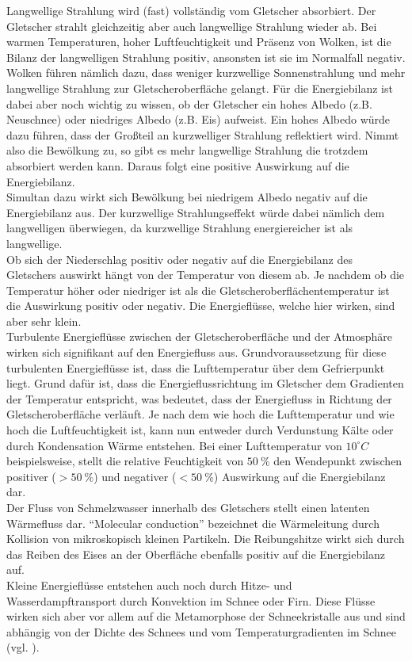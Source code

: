 \documentclass[12pt,a4paper]{article}
\begin{document}
Langwellige Strahlung wird (fast) vollständig vom Gletscher absorbiert. Der Gletscher strahlt gleichzeitig aber auch langwellige Strahlung wieder ab. Bei warmen Temperaturen, hoher Luftfeuchtigkeit und Präsenz von Wolken, ist die Bilanz der langwelligen Strahlung positiv, ansonsten ist sie im Normalfall negativ.\\
Wolken führen nämlich dazu, dass weniger kurzwellige Sonnenstrahlung und mehr langwellige Strahlung zur Gletscheroberfläche gelangt. Für die Energiebilanz ist dabei aber noch wichtig zu wissen, ob der Gletscher ein hohes Albedo (z.B. Neuschnee) oder niedriges Albedo (z.B. Eis) aufweist. Ein hohes Albedo würde dazu führen, dass der Großteil an kurzwelliger Strahlung reflektiert wird. Nimmt also die Bewölkung zu, so gibt es mehr langwellige Strahlung die trotzdem absorbiert werden kann. Daraus folgt eine positive Auswirkung auf die Energiebilanz.\\
Simultan dazu wirkt sich Bewölkung bei niedrigem Albedo negativ auf die Energiebilanz aus. Der kurzwellige Strahlungseffekt würde dabei nämlich dem langwelligen überwiegen, da kurzwellige Strahlung energiereicher ist als langwellige.\\

Ob sich der Niederschlag positiv oder negativ auf die Energiebilanz des Gletschers auswirkt hängt von der Temperatur von diesem ab. Je nachdem ob die Temperatur höher oder niedriger ist als die Gletscheroberflächentemperatur ist die Auswirkung positiv oder negativ. Die Energieflüsse, welche hier wirken, sind aber sehr klein.\\

Turbulente Energieflüsse zwischen der Gletscheroberfläche und der Atmosphäre wirken sich signifikant auf den Energiefluss aus. Grundvoraussetzung für diese turbulenten Energieflüsse ist, dass die Lufttemperatur über dem Gefrierpunkt liegt. Grund dafür ist, dass die Energieflussrichtung im Gletscher dem Gradienten der Temperatur entspricht, was bedeutet, dass der Energiefluss in Richtung der Gletscheroberfläche verläuft. Je nach dem wie hoch die Lufttemperatur und wie hoch die Luftfeuchtigkeit ist, kann nun entweder durch Verdunstung Kälte oder durch Kondensation Wärme entstehen. Bei einer Lufttemperatur von $10^\circ C$ beispielsweise, stellt die relative Feuchtigkeit von $50~\%$ den Wendepunkt zwischen positiver ($>50~\%$) und negativer ($<50~\%$) Auswirkung auf die Energiebilanz dar.\\

Der Fluss von Schmelzwasser innerhalb des Gletschers stellt einen latenten Wärmefluss dar. 
``Molecular conduction'' bezeichnet die Wärmeleitung durch Kollision von mikroskopisch kleinen Partikeln. Die Reibungshitze wirkt sich durch das Reiben des Eises an der Oberfläche ebenfalls positiv auf die Energiebilanz auf.\\
Kleine Energieflüsse entstehen auch noch durch Hitze- und Wasserdampftransport durch Konvektion im Schnee oder Firn. Diese Flüsse wirken sich aber vor allem auf die Metamorphose der Schneekristalle aus und sind abhängig von der Dichte des Schnees und vom Temperaturgradienten im Schnee (vgl. \cite[16, 17]{Themicroclimateofvalleyglaciers}).
\end{document}
